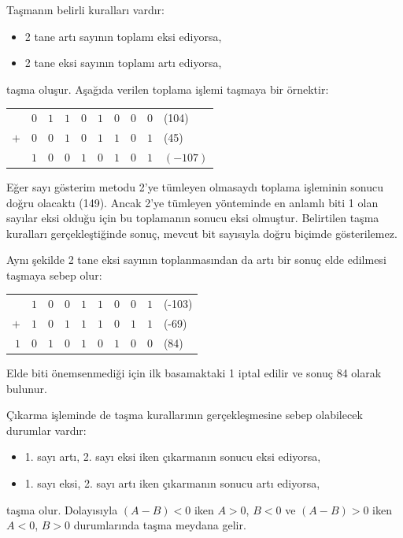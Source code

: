 Taşmanın belirli kuralları vardır:
\begin{itemize}
\item 2 tane artı sayının toplamı eksi ediyorsa,
\item 2 tane eksi sayının toplamı artı ediyorsa,
\end{itemize}
taşma oluşur. Aşağıda verilen toplama işlemi taşmaya bir örnektir:

\begin{center}
\begin{tabular}{r c c c c c c c c l}
  & $0$ & $1$ & $1$ & $0$ & $1$ & $0$ & $0$ & $0$ & (104) \\
$+$ & $0$ & $0$ & $1$ & $0$ & $1$ & $1$ & $0$ & $1$ & (45) \\
\hline
  & $1$ & $0$ & $0$ & $1$ & $0$ & $1$ & $0$ & $1$ & $(-107)$ \\
\end{tabular}
\end{center}

Eğer sayı gösterim metodu 2'ye tümleyen olmasaydı toplama işleminin sonucu doğru olacaktı (149). Ancak 2'ye tümleyen yönteminde en anlamlı biti 1 olan sayılar eksi olduğu için bu toplamanın sonucu eksi olmuştur. Belirtilen taşma kuralları gerçekleştiğinde sonuç, mevcut bit sayısıyla doğru biçimde gösterilemez.

Aynı şekilde 2 tane eksi sayının toplanmasından da artı bir sonuç elde edilmesi taşmaya sebep olur:

\begin{center}
\begin{tabular}{r c c c c c c c c l}
  & $1$ & $0$ & $0$ & $1$ & $1$ & $0$ & $0$ & $1$ & (-103) \\
$+$ & $1$ & $0$ & $1$ & $1$ & $1$ & $0$ & $1$ & $1$ & (-69) \\
\hline
$1$ & $0$ & $1$ & $0$ & $1$ & $0$ & $1$ & $0$ & $0$ & (84) \\
\end{tabular}
\end{center}

Elde biti önemsenmediği için ilk basamaktaki 1 iptal edilir ve sonuç 84 olarak bulunur.

Çıkarma işleminde de taşma kurallarının gerçekleşmesine sebep olabilecek durumlar vardır:
\begin{itemize}
\item 1. sayı artı, 2. sayı eksi iken çıkarmanın sonucu eksi ediyorsa,
\item 1. sayı eksi, 2. sayı artı iken çıkarmanın sonucu artı ediyorsa,
\end{itemize}
taşma olur. Dolayısıyla $(A-B)<0$ iken $A>0$, $B<0$ ve $(A-B)>0$ iken $A<0$, $B>0$ durumlarında taşma meydana gelir.

